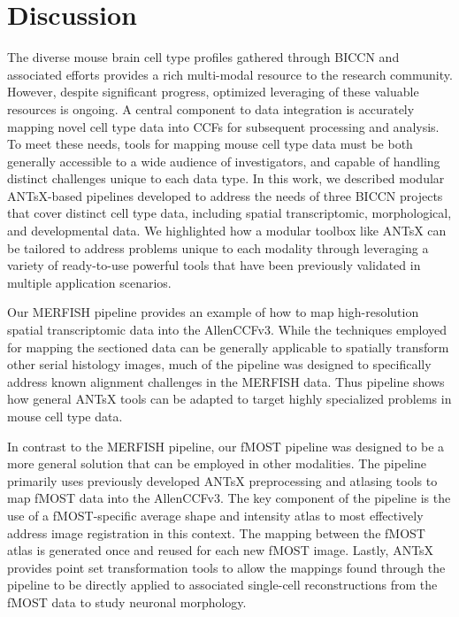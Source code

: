 \documentclass[
  12pt,
]{article}
\begin{document}
\clearpage
\newpage

\section{Discussion}\label{discussion}

The diverse mouse brain cell type profiles gathered through BICCN and
associated efforts provides a rich multi-modal resource to the research
community. However, despite significant progress, optimized leveraging
of these valuable resources is ongoing. A central component to data
integration is accurately mapping novel cell type data into CCFs for
subsequent processing and analysis. To meet these needs, tools for
mapping mouse cell type data must be both generally accessible to a wide
audience of investigators, and capable of handling distinct challenges
unique to each data type. In this work, we described modular ANTsX-based
pipelines developed to address the needs of three BICCN projects that
cover distinct cell type data, including spatial transcriptomic,
morphological, and developmental data. We highlighted how a modular
toolbox like ANTsX can be tailored to address problems unique to each
modality through leveraging a variety of ready-to-use powerful tools
that have been previously validated in multiple application scenarios.

Our MERFISH pipeline provides an example of how to map high-resolution
spatial transcriptomic data into the AllenCCFv3. While the techniques
employed for mapping the sectioned data can be generally applicable to
spatially transform other serial histology images, much of the pipeline
was designed to specifically address known alignment challenges in the
MERFISH data. Thus pipeline shows how general ANTsX tools can be adapted
to target highly specialized problems in mouse cell type data.

In contrast to the MERFISH pipeline, our fMOST pipeline was designed to
be a more general solution that can be employed in other modalities. The
pipeline primarily uses previously developed ANTsX preprocessing and
atlasing tools to map fMOST data into the AllenCCFv3. The key component
of the pipeline is the use of a fMOST-specific average shape and
intensity atlas to most effectively address image registration in this
context. The mapping between the fMOST atlas is generated once and
reused for each new fMOST image. Lastly, ANTsX provides point set
transformation tools to allow the mappings found through the pipeline to
be directly applied to associated single-cell reconstructions from the
fMOST data to study neuronal morphology.
\end{document}
